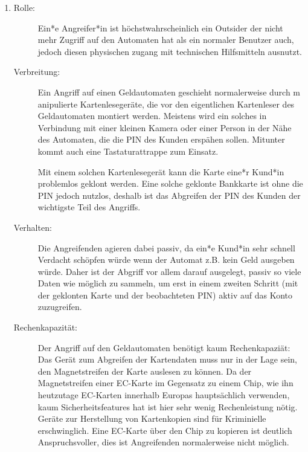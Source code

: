 \documentclass[a4paper,11pt]{scrartcl}
\begin{document}
\begin{enumerate}[1.]
    \item 
        \begin{description}
            \item[Rolle:]
                Ein*e Angreifer*in ist höchstwahrscheinlich ein Outsider der nicht 
                mehr Zugriff auf den Automaten hat als ein normaler Benutzer auch,
                jedoch diesen physischen zugang mit technischen Hilfsmitteln ausnutzt.
            \item[Verbreitung:]
                Ein Angriff auf einen Geldautomaten geschieht normalerweise durch m
                anipulierte Kartenlesegeräte, die vor den eigentlichen Kartenleser des 
                Geldautomaten montiert werden. Meistens wird ein solches in Verbindung 
                mit einer kleinen Kamera oder einer Person in der Nähe des Automaten, 
                die die PIN des Kunden erspähen sollen. Mitunter kommt auch eine 
                Tastaturattrappe zum Einsatz.

                Mit einem solchen Kartenlesegerät kann die Karte eine*r Kund*in problemlos 
                geklont werden. Eine solche geklonte Bankkarte ist ohne die PIN jedoch nutzlos, 
                deshalb ist das Abgreifen der PIN des Kunden der wichtigste Teil des Angriffs.
            \item[Verhalten:]
                Die Angreifenden agieren dabei passiv, da ein*e Kund*in sehr schnell Verdacht 
                schöpfen würde wenn der Automat z.B. kein Geld ausgeben würde. Daher ist 
                der Abgriff vor allem darauf ausgelegt, passiv so viele Daten wie möglich 
                zu sammeln, um erst in einem zweiten Schritt (mit der geklonten Karte und 
                der beobachteten PIN) aktiv auf das Konto zuzugreifen.
            \item[Rechenkapazität:]
            	Der Angriff auf den Geldautomaten benötigt kaum Rechenkapaziät: Das Gerät
            	zum Abgreifen der Kartendaten muss nur in der Lage sein, den Magnetstreifen der Karte
            	auslesen zu können. Da der Magnetstreifen einer EC-Karte im Gegensatz zu einem
            	Chip, wie ihn heutzutage EC-Karten innerhalb Europas hauptsächlich verwenden, kaum
            	Sicherheitsfeatures hat ist hier sehr wenig Rechenleistung nötig. Geräte zur
            	Herstellung von Kartenkopien sind für Kriminielle erschwinglich.
            	Eine EC-Karte über den Chip zu kopieren ist deutlich Anspruchsvoller, dies ist
            	Angreifenden normalerweise nicht möglich.

        \end{description}
\end{enumerate}
\end{document}

